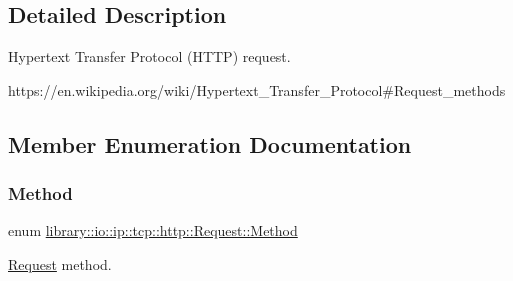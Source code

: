 \subsection{Detailed Description}
Hypertext Transfer Protocol (H\+T\+TP) request. 

https\+://en.wikipedia.\+org/wiki/\+Hypertext\+\_\+\+Transfer\+\_\+\+Protocol\#\+Request\+\_\+methods 

\subsection{Member Enumeration Documentation}
\mbox{\label{classlibrary_1_1io_1_1ip_1_1tcp_1_1http_1_1_request_a45baccf3aec384fbdbbf6ce411f11bd7}} 
\subsubsection{\texorpdfstring{Method}{Method}}
{\footnotesize\ttfamily enum \hyperlink{classlibrary_1_1io_1_1ip_1_1tcp_1_1http_1_1_request_a45baccf3aec384fbdbbf6ce411f11bd7}{library\+::io\+::ip\+::tcp\+::http\+::\+Request\+::\+Method}\hspace{0.3cm}{\ttfamily [strong]}}



\hyperlink{classlibrary_1_1io_1_1ip_1_1tcp_1_1http_1_1_request}{Request} method. 

